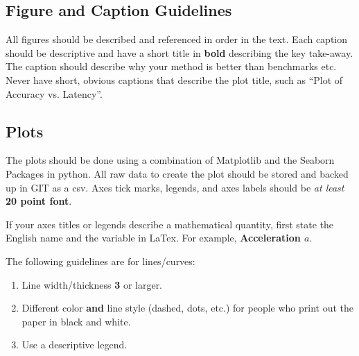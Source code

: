 \subsection{Figure and Caption Guidelines}

All figures should be described and referenced in order in the text. 
Each caption should be descriptive and have a short title in \textbf{bold} describing the key take-away. The caption should describe why your method is better than benchmarks etc. Never have short, obvious captions that describe the plot title, such as ``Plot of Accuracy vs. Latency''.

\subsection{Plots}

The plots should be done using a combination of Matplotlib and the Seaborn Packages in python. All raw data to create the plot should be stored and backed up in GIT as a csv. Axes tick marks, legends, and axes labels should be \textit{at least} \textbf{20 point font}.

If your axes titles or legends describe a mathematical quantity, first state the English name and the variable in LaTex. For example, \textbf{Acceleration $a$}.

The following guidelines are for lines/curves:

\begin{enumerate}
    \item Line width/thickness \textbf{3} or larger.
    \item Different color \textbf{and} line style (dashed, dots, etc.) for people who print out the paper in black and white.
    \item Use a descriptive legend.
\end{enumerate}

